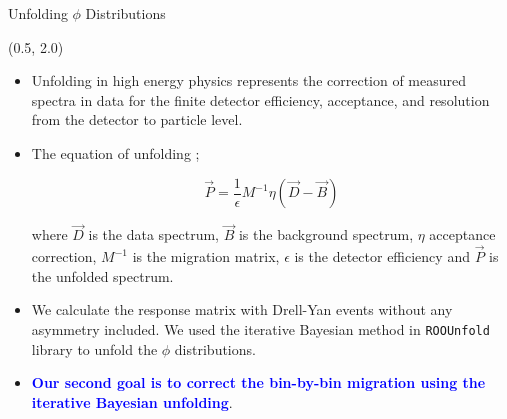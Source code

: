 \documentclass[10pt, xcolor={dvipsnames}, aspectratio = 169]{beamer}
\newcommand{\citeme}[1]{{\tiny \footfullcite{#1}}}
\begin{document}
\begin{frame}[fragile]{Unfolding $\phi$ Distributions}

\begin{textblock}{14.0}(0.5, 2.0)

\begin{itemize}

\item Unfolding in high energy physics represents the correction of measured spectra in data for the finite detector
efficiency, acceptance, and resolution from the detector to particle level.

\item The equation of unfolding ;

\begin{equation*}
\vec{P} = \frac{1}{\epsilon} M^{-1} \eta (\vec{D}-\vec{B})
\end{equation*}

where $\vec{D}$ is the data spectrum, $\vec{B}$ is the background spectrum, $\eta$ acceptance correction, $M^{-1}$ is the migration matrix, $\epsilon$ is the detector efficiency and $\vec{P}$ is the unfolded spectrum.

%

\item We calculate the response matrix with Drell-Yan events without any asymmetry included. We used the iterative Bayesian method in \verb|ROOUnfold| library to unfold the $\phi$ distributions. \citeme{Wynne:2012jb}
\item \textcolor{blue}{\textbf{Our second goal is to correct the bin-by-bin migration using the iterative Bayesian unfolding}}.

\end{itemize}

\end{textblock}

\end{frame}

\end{document}
